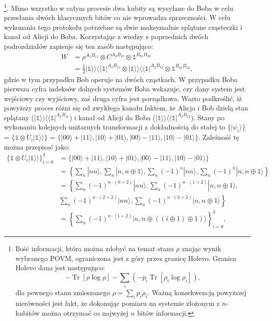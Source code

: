 \documentclass[10pt]{article} %
\DeclareMathOperator{\Trs}{Tr}
\newcommand{\Ket}[1]{|#1\rangle}
\newcommand{\BBra}[1]{\langle\langle#1|}
\newcommand{\KKet}[1]{|#1\rangle\rangle}
\newcommand{\I}{\mathbb{1}}
\begin{document}
\footnote
{
Ilość informacji, która można zdobyć na temat stanu $\rho$ znając wynik wybranego POVM, ograniczona jest z góry przez granicę Holevo. Granica Holevo dana jest następująco:
\[
-\Trs\left[\rho \log \rho\right] - \sum_i \left(-p_i \Trs \left[ \rho_i \log \rho_i \right]\right),
\]
dla pewnego stanu zmieszanego $\rho = \sum_i p_i \rho_i$. Ważną konsekwencją powyższej nierówności jest fakt, że dokonując pomiaru na systemie złożonym z $n$-kubitów można otrzymać co najwyżej $n$ bitów informacji.
}. Mimo wszystko w całym procesie dwa kubity są wysyłane do Boba w celu przesłania dwóch klasycznych bitów co nie wprowadza sprzeczności.
W celu wykonania tego protokołu potrzebne są dwie maksymalnie splątane cząsteczki i kanał od Alicji do Boba. Korzystając z wiedzy z poprzednich dwóch podrozdziałów zapisuje się ten zasób następująco:
\begin{equation}
\begin{split}
W &=  \rho^{A_1 B_{11}} \otimes C^{A_2 B_{12}} \otimes \I^{B_{21}B_{22}} \\&=\frac{1}{2}\KKet{\I}\BBra{\I}^{A_1B_{11}} \otimes \KKet{\I}\BBra{\I}^{A_2B_{12}} \otimes \I^{B_{21}B_{22}},
\end{split}
\end{equation} gdzie w tym przypadku Bob operuje na dwóch cząstkach. W przypadku Boba pierwsza cyfra indeksów dolnych systemów Boba wskazuje, czy dany system jest wejściowy czy wyjściowy, zaś druga cyfra jest porządkowa. Warto podkreślić, iż powyższy proces różni się od zwykłego kanału faktem, że Alicja i Bob dzielą stan splątany ($\KKet{\I}\BBra{\I}^{A_1B_{11}}$) i kanał od Alicji do Boba ($\KKet{\I}\BBra{\I}^{A_2B_{12}}$).
Stany po wykonaniu kolejnych unitarnych transformacji z dokładnością do stałej to $\{ \Ket{\psi_i} \}$ = $\{\I \otimes U_i \KKet{\I} \}$ = $\{ \Ket{00} + \Ket{11}, \Ket{10} + \Ket{01}, \Ket{00} - \Ket{11}, \Ket{10} - \Ket{01}\}$. Zależność tę można przepisać jako:
\begin{equation}
\begin{split}
\{\I \otimes U_i \KKet{\I} \}_{i=0}^3 &= 
\{ \Ket{00} + \Ket{11}, \Ket{10} + \Ket{01}, \Ket{00} - \Ket{11}, \Ket{10} - \Ket{01}\} \\
& = \left\{ \sum_{n} \Ket{nn}, \sum_{n} \Ket{n,n\oplus 1}, \sum_{n} (-1)^{n} \Ket{nn}, \sum_{n} (-1)^{n} \Ket{n,n\oplus 1} \right\}\\
&= \left\{ \sum_{n} (-1)^{n\cdot (0 \div 2)}\Ket{nn}, \sum_{n} (-1)^{n\cdot (1 \div 2)}\Ket{n,n\oplus 1}, \right.
\\&\sum_{n} (-1)^{n\cdot (2 \div 2)} \Ket{nn},  
\left.\sum_{n} (-1)^{n\cdot (3 \div 2)} \Ket{n,n\oplus 1} \right\} \\
&= \left\{ \sum_{n} (-1)^{n\cdot (i \div 2)} \Ket{n,n\oplus ((i \oplus 1) \oplus 1)} \right\}_{i=0}^3,
\end{split}
\end{equation}
\end{document}

